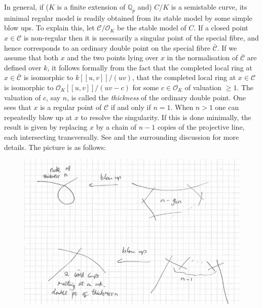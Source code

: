 \documentclass[12pt]{amsart}
\numberwithin{equation}{section}
\theoremstyle{remark}
\theoremstyle{definition}
\theoremstyle{definition}
\theoremstyle{definition}
\theoremstyle{definition}
\theoremstyle{definition}
\theoremstyle{definition}
\begin{document}
In general, if ($K$ is a finite extension of $\mathbb{Q}_p$ and) $C/K$ is a semistable curve,  its minimal regular model is readily obtained from its stable model by some simple blow ups. To explain this, let $\mathcal{C}/\mathcal{O}_K$ be the stable model of $C$. If a closed point $x\in \mathcal{C}$ is non-regular then it is necessarily a singular point of the special fibre, and hence corresponds to an ordinary double point on the special fibre $\bar{\mathcal{C}}$. If we assume that both $x$ and the two points lying over $x$ in the normalisation of $\bar{\mathcal{C}}$ are defined over $k$, it follows formally from the fact that the completed local ring at $x\in  \bar{\mathcal{C}}$ is isomorphic to $k[[u,v]]/(uv)$, that the completed local ring at $x\in \mathcal{C}$ is isomorphic to $\mathcal{O}_K[[u,v]]/(uv-c)$ for some $c\in \mathcal{O}_K$ of valuation $\geq 1$. The valuation of $c$, say $n$, is called the \textit{thickness} of the ordinary double point. One sees that $x$ is a regular point of $\mathcal{C}$ if and only if $n=1$. When $n> 1$ one can repeatedly blow up at $x$ to resolve the singularity. If this is done minimally, the result is given by replacing $x$ by  a chain of $n-1$ copies of the projective line, each intersecting transversally. See \cite[Corollary 10.3.25]{MR1917232} and the surrounding discussion for more details. The picture is as follows: 

\begin{figure} [!htb] 
\includegraphics[angle=0,scale=0.5]{thickness}
\end{figure}



\newpage 
\end{document}
